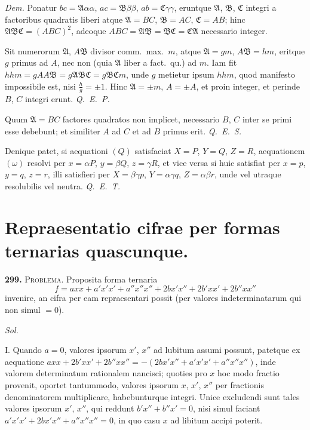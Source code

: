 \documentclass[12pt,a4paper]{article}
\theoremstyle{plain}
\theoremstyle{definition}
\theoremstyle{remark}
\begin{document}
\textit{Dem.} Ponatur $bc = \mathfrak{A}\alpha\alpha$, $ac = \mathfrak{B}\beta\beta$, $ab = \mathfrak{C}\gamma\gamma$, eruntque $\mathfrak{A}$, $\mathfrak{B}$, $\mathfrak{C}$ integri a factoribus quadratis liberi atque $\mathfrak{A} = BC$, $\mathfrak{B} = AC$, $\mathfrak{C} = AB$; hinc $\mathfrak{A}\mathfrak{B}\mathfrak{C} = (ABC)^2$, adeoque $ABC = \mathfrak{A}\mathfrak{B} = \mathfrak{B}\mathfrak{C} = \mathfrak{C}\mathfrak{A}$ necessario integer.

Sit numerorum $\mathfrak{A}$, $A\mathfrak{B}$ divisor comm.~max.~$m$, atque $\mathfrak{A} = gm$, $A\mathfrak{B} = hm$, eritque $g$ primus ad $A$, nec non (quia $\mathfrak{A}$ liber a fact.~qu.) ad $m$. Iam fit $hhm = gAA\mathfrak{B} = g\mathfrak{A}\mathfrak{B}\mathfrak{C} = g\mathfrak{B}\mathfrak{C}m$, unde $g$ metietur ipsum $hhm$, quod manifesto impossibile est, nisi $\tfrac{h}{g} = \pm 1$. Hinc $\mathfrak{A} = \pm m$, $A = \pm A$, et proin integer, et perinde $B$, $C$ integri erunt. \textit{Q.~E.~P.}

Quum $\mathfrak{A} = BC$ factores quadratos non implicet, necessario $B$, $C$ inter se primi esse debebunt; et similiter $A$ ad $C$ et ad $B$ primus erit. \textit{Q.~E.~S.}

Denique patet, si aequationi $(Q)$ satisfaciat $X = P$, $Y = Q$, $Z = R$, aequationem $(\omega)$ resolvi per $x = \alpha P$, $y = \beta Q$, $z = \gamma R$, et vice versa si huic satisfiat per $x = p$, $y = q$, $z = r$, illi satisfieri per $X = \beta\gamma p$, $Y = \alpha\gamma q$, $Z = \alpha\beta r$, unde vel utraque resolubilis vel neutra. \textit{Q.~E.~T.}

\section*{Repraesentatio cifrae per formas ternarias quascunque.}

\textbf{299.} \textsc{Problema.} Proposita forma ternaria
\[
f = axx + a'x'x' + a''x''x'' + 2bx'x'' + 2b'xx' + 2b''xx''
\]
invenire, an cifra per eam repraesentari possit (per valores indeterminatarum qui non simul $= 0$).

\textit{Sol.}

\textsc{I.} Quando $a = 0$, valores ipsorum $x'$, $x''$ ad lubitum assumi possunt, patetque ex aequatione $axx + 2b'xx' + 2b''xx'' = -(2bx'x'' + a'x'x' + a''x''x'')$, inde valorem determinatum rationalem nancisci; quoties pro $x$ hoc modo fractio provenit, oportet tantummodo, valores ipsorum $x$, $x'$, $x''$ per fractionis denominatorem multiplicare, habebunturque integri. Unice excludendi sunt tales valores ipsorum $x'$, $x''$, qui reddunt $b'x'' + b''x' = 0$, nisi simul faciant $a'x'x' + 2bx'x'' + a''x''x'' = 0$, in quo casu $x$ ad libitum accipi poterit.
\end{document}
